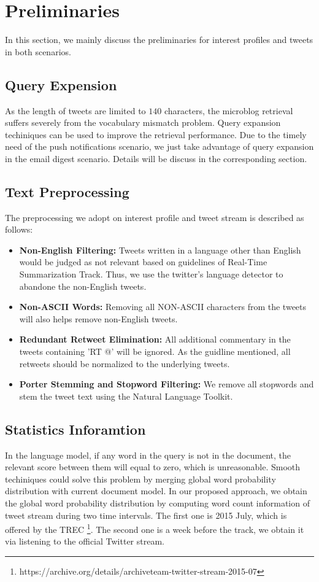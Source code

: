 \section{Preliminaries}
In this section, we mainly discuss the preliminaries for interest profiles and tweets in both scenarios.

\subsection{Query Expension}
As the length of tweets are limited to $140$ characters, the microblog retrieval
suffers severely from the vocabulary mismatch problem.
Query expansion techiniques can be used to improve the retrieval performance.
Due to the timely need of the push notifications scenario,
we just take advantage of query expansion in the email digest scenario.
Details will be discuss in the corresponding section.

\subsection{Text Preprocessing}
The preprocessing we adopt on interest profile and tweet stream is described as follows:
\begin{itemize}
\item \textbf{Non-English Filtering:} Tweets written in a language other than English would be judged as not relevant based on guidelines of Real-Time Summarization Track. Thus, we use the twitter's language detector to abandone the non-English tweets.
\item \textbf{Non-ASCII Words:} Removing all NON-ASCII characters from the tweets will also helps remove non-English tweets.
\item \textbf{Redundant Retweet Elimination:} All additional commentary in the tweets containing 'RT @' will be ignored. As the guidline mentioned, all retweets should be normalized to the underlying tweets.
\item \textbf{Porter Stemming and Stopword Filtering:} We remove all stopwords and stem the tweet text using the Natural Language Toolkit.
\end{itemize}

\subsection{Statistics Inforamtion}
In the language model, if any word in the query is not in the document,
the relevant score between them will equal to zero, which is unreasonable.
Smooth techiniques could solve this problem by merging global word
probability distribution with current document model.
In our proposed approach, we obtain the global word probability distribution
by computing word count information of tweet stream during two time intervals.
The first one is 2015 July, which is offered by the TREC
\footnote{https://archive.org/details/archiveteam-twitter-stream-2015-07}.
The second one is a week before the track, we obtain it via listening to
the official Twitter stream.
